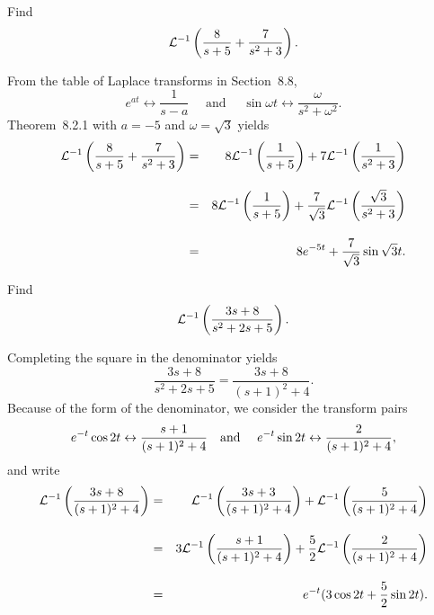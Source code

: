 \setcounter{example}{1}
\begin{example}
  \label{example:8.2.2}\rm Find
  \[
    {\cal L}^{-1}\left(\frac{8}{s+5}+\frac{7}{s^{2}+3}\right).
  \]
\end{example}
\begin{examplesolution}
\solution From the table of Laplace transforms in Section~8.8,
\[
  e^{at}\leftrightarrow\frac{1}{s-a}\quad\mbox{ and }\quad \sin\omega t\leftrightarrow\frac{\omega}{s^{2}+\omega^{2}}.
\]
Theorem~8.2.1 with $a=-5$ and $\omega=\sqrt{3}$ yields
\begin{eqnarray*}
  {\cal L}^{-1}\left(\frac{8}{s+5}+\frac{7}{s^{2}+3}\right) & = & 8{\cal L}^{-1}\left(\frac{1}{s+5}\right)+7{\cal L}^{-1}\left(\frac{1}{s^{2}+3}\right)                         \\[10pt]
                                                            & = & 8{\cal L}^{-1}\left(\frac{1}{s+5}\right)+\frac{7}{\sqrt{3}}{\cal L}^{-1}\left(\frac{\sqrt{3}}{s^{2}+3}\right) \\[10pt]
                                                            & = & 8e^{-5t}+\frac{7}{\sqrt{3}}\sin\sqrt{3}t.
\end{eqnarray*}
\end{examplesolution}

\setcounter{example}{2}
\begin{example}
  \label{example:8.2.3}\rm Find
  \[
    {\cal L}^{-1}\left(\frac{3s+8}{s^{2}+2s+5}\right).
  \]
\end{example}
\begin{examplesolution}
\solution Completing the square in the denominator yields
\[
  \frac{3s+8}{s^{2}+2s+5}=\frac{3s+8}{(s+1)^{2}+4}.
\]
Because of the form of the denominator, we consider the transform pairs
\[
  e^{-t}\cos2t\leftrightarrow\frac{s+1}{(s+1)^{2}+4}\mbox{\quad and \quad}e^{-t}\sin2t\leftrightarrow\frac{2}{(s+1)^{2}+4},
\]
and write
\begin{eqnarray*}
  {\cal L}^{-1}\left(\frac{3s+8}{(s+1)^{2}+4}\right) & = & {\cal L}^{-1}\left(\frac{3s+3}{(s+1)^{2}+4}\right)+{\cal L}^{-1}\left(\frac{5}{(s+1)^{2}+4}\right)            \\[10pt]
                                                     & = & 3{\cal L}^{-1}\left(\frac{s+1}{(s+1)^{2}+4}\right)+\frac{5}{2}{\cal L}^{-1}\left(\frac{2}{(s+1)^{2}+4}\right) \\[10pt]
                                                     & = & e^{-t}(3\cos2t+\frac{5}{2}\sin2t).
\end{eqnarray*}
\end{examplesolution}

